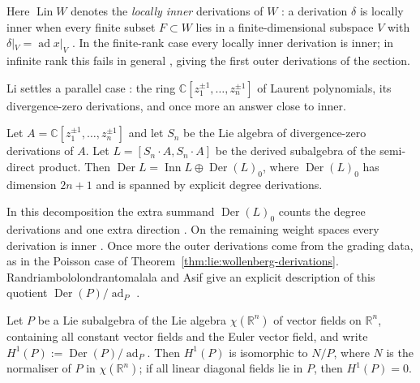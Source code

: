 Here $\operatorname{Lin} W$ denotes the \emph{locally inner}
derivations of $W$ \cite[p.~47]{IkedaKawamoto1990}:
a derivation $\delta$ is locally inner when every finite subset
$F\subset W$ lies in a finite-dimensional subspace $V$ with
$\delta|_{V}=\operatorname{ad} x|_{V}$ \cite[p.~47]{IkedaKawamoto1990}.
In the finite-rank case every locally
inner derivation is inner; in infinite rank this fails in general
\cite[Remark, p.~55]{IkedaKawamoto1990}, giving the first outer
derivations of the section.

Li settles a parallel case \cite[Theorem~3.6]{Li2019}: the ring
$\mathbb{C}[z_{1}^{\pm 1},\dots,z_{n}^{\pm 1}]$ of Laurent polynomials,
its divergence-zero derivations, and once more an answer close to inner.

\begin{theorem}[{\cite[Theorem~3.6]{Li2019}}]\label{thm:lie:li-derivations}
Let $A=\mathbb{C}[z_{1}^{\pm 1},\dots,z_{n}^{\pm 1}]$ and let $S_{n}$ be
the Lie algebra of divergence-zero derivations of $A$.  Let
$L=[S_{n}\!\cdot\!A,S_{n}\!\cdot\!A]$ be the derived subalgebra of the
semi-direct product.  Then
$\operatorname{Der} L=\operatorname{Inn} L\oplus\operatorname{Der}(L)_{0}$,
where $\operatorname{Der}(L)_{0}$ has dimension $2n+1$ and is spanned by
explicit degree derivations.
\end{theorem}

In this decomposition the extra summand $\operatorname{Der}(L)_{0}$
counts the degree derivations and one extra direction
\cite[Theorem~3.6]{Li2019}.  On the remaining weight spaces every
derivation is inner \cite[Theorem~3.6]{Li2019}.  Once more the outer
derivations come from the grading data, as in the Poisson case of
Theorem~\ref{thm:lie:wollenberg-derivations}.
Randriambololondrantomalala and Asif give an explicit description of
this quotient $\operatorname{Der}(P)/\operatorname{ad}_{P}$
\cite[Theorem~2.4, p.~52]{RandriambololondrantomalalaAsif2022}.

\begin{theorem}\label{thm:lie:h1-vector-fields}
Let $P$ be a Lie subalgebra of the Lie algebra $\chi(\mathbb{R}^{n})$ of
vector fields on $\mathbb{R}^{n}$, containing all constant vector fields
and the Euler vector field, and write
$H^{1}(P):=\operatorname{Der}(P)/\operatorname{ad}_{P}$.  Then
$H^{1}(P)$ is isomorphic to $N/P$, where $N$ is the normaliser of $P$ in
$\chi(\mathbb{R}^{n})$; if all linear diagonal fields lie in $P$, then
$H^{1}(P)=0$.
\end{theorem}

